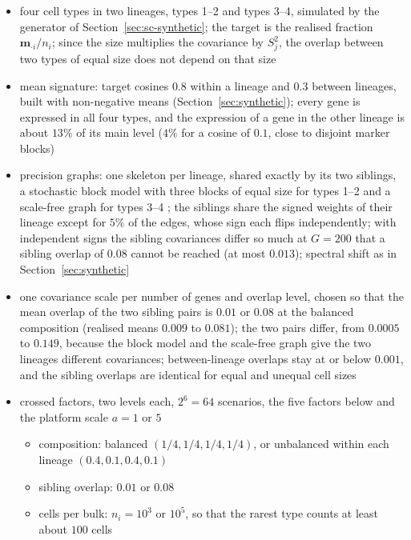 \documentclass[pdflatex, sn-nature]{sn-jnl}
\theoremstyle{thmstyleone}%
\theoremstyle{thmstyletwo}%
\theoremstyle{thmstylethree}%
\begin{document}
\begin{itemize}
  \item four cell types in two lineages, types 1--2 and types 3--4, simulated by the generator of
        Section~\ref{sec:sc-synthetic}; the target is the realised fraction \(\boldsymbol{m}_{\cdot i}/n_{i}\); since the size
        multiplies the covariance by \(S_{j}^{2}\), the overlap between two types of equal size does not depend on that size
  \item mean signature: target cosines \(0.8\) within a lineage and \(0.3\) between lineages, built with non-negative
        means (Section~\ref{sec:synthetic}); every gene is expressed in all four types, and the expression of a gene in
        the other lineage is about \(13\%\) of its main level (\(4\%\) for a cosine of \(0.1\), close to disjoint marker
        blocks)
  \item precision graphs: one skeleton per lineage, shared exactly by its two siblings, a stochastic block model with
        three blocks of equal size for types 1--2 \cite{hollandStochasticBlockmodelsFirst1983} and a scale-free graph for
        types 3--4 \cite{barabasiEmergenceScalingRandom1999}; the siblings share the signed weights of their lineage except
        for \(5\%\) of the edges, whose sign each flips independently; with independent signs the sibling covariances
        differ so much at \(G=200\) that a sibling overlap of \(0.08\) cannot be reached (at most \(0.013\)); spectral
        shift as in Section~\ref{sec:synthetic}
  \item one covariance scale per number of genes and overlap level, chosen so that the mean overlap of the two sibling
        pairs is \(0.01\) or \(0.08\) at the balanced composition (realised means \(0.009\) to \(0.081\)); the two pairs
        differ, from \(0.0005\) to \(0.149\), because the block model and the scale-free graph give the two lineages
        different covariances; between-lineage overlaps stay at or below \(0.001\), and the sibling overlaps are
        identical for equal and unequal cell sizes
  \item crossed factors, two levels each, \(2^{6}=64\) scenarios, the five factors below and the platform scale \(a=1\) or \(5\)
  \begin{itemize}
    \item composition: balanced \((1/4,1/4,1/4,1/4)\), or unbalanced within each lineage \((0.4,0.1,0.4,0.1)\)
    \item sibling overlap: \(0.01\) or \(0.08\)
    \item cells per bulk: \(n_{i}=10^{3}\) or \(10^{5}\), so that the rarest type counts at least about \(100\) cells

\end{itemize}
\end{itemize}
\end{document}
